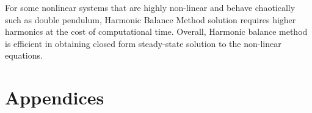 \documentclass[12pt, a4paper]{extarticle}
\begin{document}
For some nonlinear systems that are highly non-linear and behave chaotically such as double pendulum, Harmonic Balance Method solution requires higher harmonics at the cost of computational time. Overall, Harmonic balance method is efficient in obtaining closed form steady-state solution to the non-linear equations.

\newpage
\section{Appendices}

\newpage

\newpage

\newpage

\newpage

\newpage

\newpage

\newpage

\newpage


\end{document}
